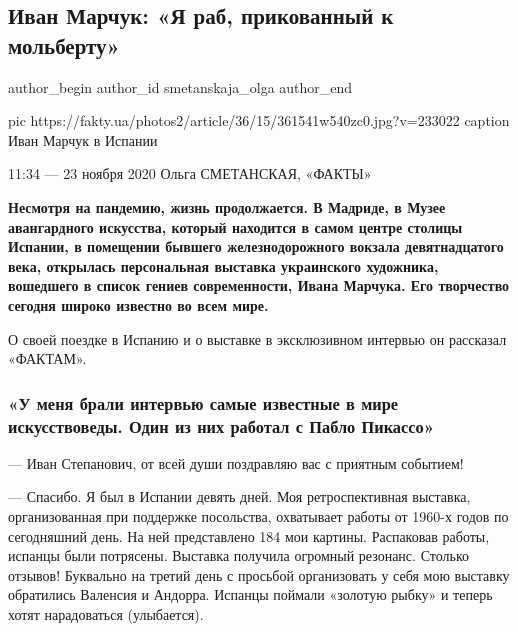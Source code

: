  
 
 
 
 
 
\subsection{Иван Марчук: «Я раб, прикованный к мольберту»}
\label{sec:23_11_2020.news.ua.fakty.smetanskaja_olga.1.marchuk_rab_molbert}
\ifcmt
	author_begin
   author_id smetanskaja_olga
	author_end
\fi
{}

\ifcmt
	 pic https://fakty.ua/photos2/article/36/15/361541w540zc0.jpg?v=233022
	 caption Иван Марчук в Испании
\fi

11:34 --- 23 ноября 2020
Ольга СМЕТАНСКАЯ, «ФАКТЫ»

\begin{leftbar}
	\bfseries
Несмотря на пандемию, жизнь продолжается. В Мадриде, в Музее авангардного
искусства, который находится в самом центре столицы Испании, в помещении
бывшего железнодорожного вокзала девятнадцатого века, открылась
персональная выставка украинского художника, вошедшего в список гениев
современности, Ивана Марчука. Его творчество сегодня широко известно
во всем мире.
\end{leftbar}

О своей поездке в Испанию и о выставке в эксклюзивном интервью
он рассказал «ФАКТАМ».

\subsubsection{«У меня брали интервью самые известные в мире искусствоведы. Один из них работал с Пабло Пикассо»}

--- Иван Степанович, от всей души поздравляю вас с приятным событием!

--- Спасибо. Я был в Испании девять дней. Моя ретроспективная выставка,
организованная при поддержке посольства, охватывает работы от 1960-х годов
по сегодняшний день. На ней представлено 184 мои картины. Распаковав
работы, испанцы были потрясены. Выставка получила огромный резонанс.
Столько отзывов! Буквально на третий день с просьбой организовать у себя
мою выставку обратились Валенсия и Андорра. Испанцы поймали «золотую
рыбку» и теперь хотят нарадоваться (улыбается).

